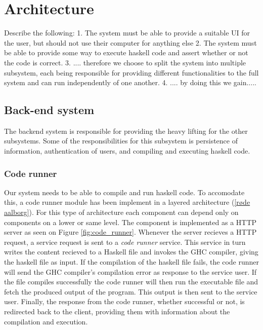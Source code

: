 \section{Architecture}
Describe the following:
1. The system must be able to provide a suitable UI for the user, but should not use their computer for anything else 
2. The system must be able to provide some way to execute haskell code and assert whether or not the code is correct. 
3. .... therefore we choose to split the system into multiple subsystem, each being responsible for providing different functionalities to the full system and can run independently of one another. 
4. .... by doing this we gain.....


\subsection{Back-end system}
The backend system is responsible for providing the heavy lifting for the other subsystems. %
Some of the responsibilities for this subsystem is persistence of information, authentication of users, and compiling and executing haskell code.

\subsubsection{Code runner}
Our system needs to be able to compile and run haskell code. To accomodate this, a code runner module has been implement in a layered architecture (\ref{røde aalborg}).
For this type of architecture each component can depend only on components on a lower or same level. 
The component is implemented as a HTTP server as seen on Figure \ref{fig:code_runner}.
Whenever the server recieves a HTTP request, a service request is sent to a \textit{code runner} service.
This service in turn writes the content recieved to a Haskell file and invokes the GHC compiler, giving the haskell file as input.
If the compilation of the haskell file fails, the code runner will send the GHC compiler's compilation error as response to the service user.
If the file compiles successfully the code runner will then run the executable file and fetch the produced output of the program.
This output is then sent to the service user.
Finally, the response from the code runner, whether successful or not, is redirected back to the client, providing them with information about the compilation and execution.


